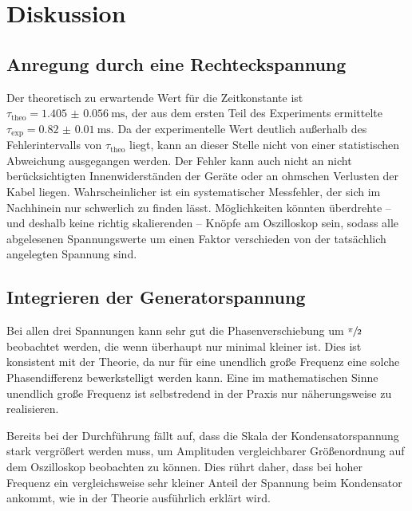 \section{Diskussion}
\label{sec:Diskussion}

\subsection{Anregung durch eine Rechteckspannung}

Der theoretisch zu erwartende Wert für die Zeitkonstante ist $\tau _\text{theo}=\SI{1.405(56)}{\milli\second}$, der aus dem 
ersten Teil des Experiments ermittelte ${\tau _\text{exp}=\SI{0.82(1)}{\milli\second}}$. 
Da der experimentelle Wert deutlich außerhalb des Fehlerintervalls von $\tau _\text{theo}$ liegt, kann an dieser Stelle 
nicht von einer statistischen Abweichung ausgegangen werden. 
Der Fehler kann auch nicht an nicht berücksichtigten Innenwiderständen der Geräte oder an ohmschen Verlusten der Kabel 
liegen. 
Wahrscheinlicher ist ein systematischer Messfehler, der sich im Nachhinein nur schwerlich zu finden lässt. 
Möglichkeiten könnten überdrehte -- und deshalb keine richtig skalierenden -- Knöpfe am Oszilloskop sein, sodass alle 
abgelesenen Spannungswerte um einen Faktor verschieden von der tatsächlich angelegten Spannung sind. 

\subsection{Integrieren der Generatorspannung}

Bei allen drei Spannungen kann sehr gut die Phasenverschiebung um $\sfrac{\pi}{2}$ beobachtet werden, die wenn überhaupt 
nur minimal kleiner ist. 
Dies ist konsistent mit der Theorie, da nur für eine unendlich große Frequenz eine solche Phasendifferenz bewerkstelligt 
werden kann. Eine im mathematischen Sinne unendlich große Frequenz ist selbstredend in der Praxis nur näherungsweise zu 
realisieren. 

Bereits bei der Durchführung fällt auf, dass die Skala der Kondensatorspannung stark vergrößert werden muss, um Amplituden 
vergleichbarer Größenordnung auf dem Oszilloskop beobachten zu können. 
Dies rührt daher, dass bei hoher Frequenz ein vergleichsweise sehr kleiner Anteil der Spannung beim Kondensator ankommt, 
wie in der Theorie ausführlich erklärt wird. 

